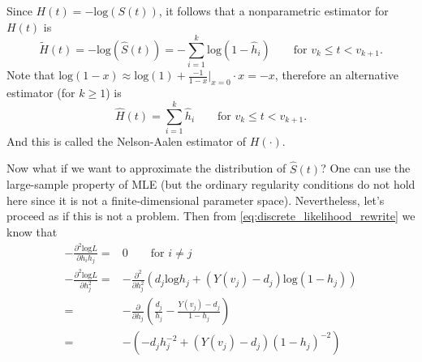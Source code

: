 \documentclass[a4paper,12pt]{article}
\begin{document}
\par

Since $H\left(t\right) = -\mathrm{log}\left(S\left(t\right)\right)$, it follows that a nonparametric estimator for $H\left(t\right)$ is
\[
  \tilde{H}\left(t\right) = -\mathrm{log}\left(\hat{S}\left(t\right)\right) =
  -\sum\limits_{i = 1}^k\mathrm{log}\left(1 - \hat{h}_i\right)
  \quad\quad\text{for } v_k\leq t < v_{k + 1}
  .
\]
Note that $\mathrm{log}\left(1 - x\right) \approx \mathrm{log}\left(1\right) + \frac{-1}{1 - x}|_{x = 0}\cdot x = -x$, therefore an alternative estimator (for $k\geq 1$) is
\[
  \hat{H}\left(t\right) = \sum\limits_{i = 1}^k\hat{h}_i
  \quad\quad\text{for } v_k\leq t < v_{k + 1}
  .  
\]
And this is called the {\color{red}Nelson-Aalen} estimator of $H\left(\cdot\right)$.
\par
Now what if we want to approximate the distribution of $\hat{S}\left(t\right)$? One can use the large-sample property of MLE (but the ordinary regularity conditions do not hold here since it is not a finite-dimensional parameter space). Nevertheless, let's proceed as if this is not a problem. Then from \eqref{eq:discrete_likelihood_rewrite} we know that
\[
  \begin{aligned}
    -\frac{\partial^2\mathrm{log}L}{\partial h_ih_j}
    =& 0
       \quad\quad\text{for } i\neq j    \\
    -\frac{\partial^2\mathrm{log}L}{\partial h_j^2}
    =& - \frac{\partial^2}{\partial h_j^2}\left(
       d_j\mathrm{log}h_j + \left(Y\left(v_j\right) - d_j\right)\mathrm{log}\left(1 - h_j\right)
       \right)    \\
    =& - \frac{\partial}{\partial h_j}\left(
       \frac{d_j}{h_j} - \frac{Y\left(v_j\right) - d_j}{1 - h_j}
       \right)    \\
    =& - \left(
       -d_j h_j^{-2}
       + \left(Y\left(v_j\right) - d_j\right)\left(1 - h_j\right)^{-2}
       \right)
  \end{aligned}
\]



\end{document}
